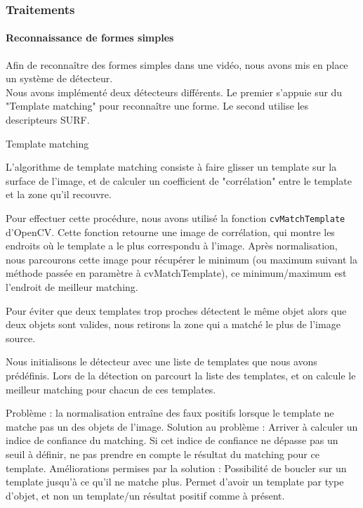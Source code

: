 \subsubsection{Traitements}

\paragraph{Reconnaissance de formes simples}

Afin de reconnaître des formes simples dans une vidéo, nous avons mis en place un système de détecteur.\\

Nous avons implémenté deux détecteurs différents. Le premier s'appuie sur du "Template matching" pour reconnaître une forme. Le second utilise les descripteurs SURF.

Template matching

L'algorithme de template matching consiste à faire glisser un template sur la surface de l'image, et de calculer un coefficient de "corrélation" entre le template et la zone qu'il recouvre.

Pour effectuer cette procédure, nous avons utilisé la fonction \texttt{cvMatchTemplate} d'OpenCV. Cette fonction retourne une image de corrélation, qui montre les endroits où le template a le plus correspondu à l'image. Après normalisation, nous parcourons cette image pour récupérer le minimum (ou maximum suivant la méthode passée en paramètre à cvMatchTemplate), ce minimum/maximum est l'endroit de meilleur matching.

Pour éviter que deux templates trop proches détectent le même objet alors que deux objets sont valides, nous retirons la zone qui a matché le plus de l'image source.

Nous initialisons le détecteur avec une liste de templates que nous avons prédéfinis.
Lors de la détection on parcourt la liste des templates, et on calcule le meilleur matching pour chacun de ces templates.

Problème : la normalisation entraîne des faux positifs lorsque le template ne matche pas un des objets de l'image.
Solution au problème : Arriver à calculer un indice de confiance du matching. Si cet indice de confiance ne dépasse pas un seuil à définir, ne pas prendre en compte le résultat du matching pour ce template.
Améliorations permises par la solution : Possibilité de boucler sur un template jusqu'à ce qu'il ne matche plus. Permet d'avoir un template par type d'objet, et non un template/un résultat positif comme à présent.

